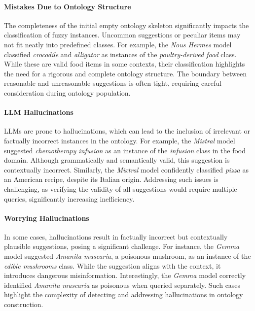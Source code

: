 \paragraph{Mistakes Due to Ontology Structure}
%
The completeness of the initial empty ontology skeleton significantly impacts the classification of fuzzy instances.
%
Uncommon suggestions or peculiar items may not fit neatly into predefined classes.
%
For example, the \emph{Nous Hermes} model classified \emph{crocodile} and \emph{alligator} as instances of the \emph{poultry-derived food} class.
%
While these are valid food items in some contexts, their classification highlights the need for a rigorous and complete ontology structure.
%
The boundary between reasonable and unreasonable suggestions is often tight, requiring careful consideration during ontology population.

\paragraph{\Gls{LLM} Hallucinations}
%
\glspl{LLM} are prone to hallucinations, which can lead to the inclusion of irrelevant or factually incorrect instances in the ontology.
%
For example, the \emph{Mistral} model suggested \emph{chemotherapy infusion} as an instance of the \emph{infusion} class in the food domain.
%
Although grammatically and semantically valid, this suggestion is contextually incorrect.
%
Similarly, the \emph{Mixtral} model confidently classified \emph{pizza} as an American recipe, despite its Italian origin.
%
Addressing such issues is challenging, as verifying the validity of all suggestions would require multiple queries, significantly increasing inefficiency.

\paragraph{Worrying Hallucinations}
%
In some cases, hallucinations result in factually incorrect but contextually plausible suggestions, posing a significant challenge.
%
For instance, the \emph{Gemma} model suggested \emph{Amanita muscaria}, a poisonous mushroom, as an instance of the \emph{edible mushrooms} class.
%
While the suggestion aligns with the context, it introduces dangerous misinformation.
%
Interestingly, the \emph{Gemma} model correctly identified \emph{Amanita muscaria} as poisonous when queried separately.
%
Such cases highlight the complexity of detecting and addressing hallucinations in ontology construction.



